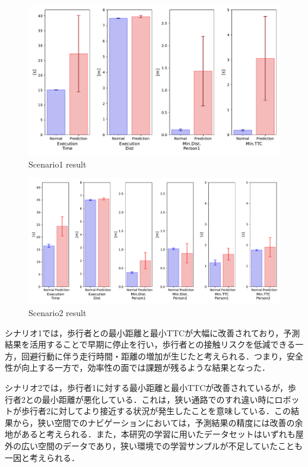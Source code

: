 \begin{figure}[H]
  \centering
 \includegraphics[keepaspectratio, scale=0.53]
      {images/scenario1_result.pdf}
  \caption{Scenario1 result}
 \label{Fig:scenario1-result}
\end{figure} 

\begin{figure}[H]
  \centering
 \includegraphics[keepaspectratio, scale=0.44]
      {images/scenario2_result.pdf}
  \caption{Scenario2 result}
 \label{Fig:scenario2-result}
\end{figure} 

\newpage

シナリオ1では，歩行者との最小距離と最小TTCが大幅に改善されており，予測結果を活用することで早期に停止を行い，歩行者との接触リスクを低減できる一方，回避行動に伴う走行時間・距離の増加が生じたと考えられる．つまり，安全性が向上する一方で，効率性の面では課題が残るような結果となった．

シナリオ2では，歩行者1に対する最小距離と最小TTCが改善されているが，歩行者2との最小距離が悪化している．これは，狭い通路でのすれ違い時にロボットが歩行者2に対してより接近する状況が発生したことを意味している．この結果から，狭い空間でのナビゲーションにおいては，予測結果の精度には改善の余地があると考えられる．また，本研究の学習に用いたデータセットはいずれも屋外の広い空間のデータであり，狭い環境での学習サンプルが不足していたことも一因と考えられる．

